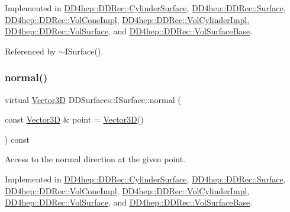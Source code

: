 Implemented in \hyperlink{class_d_d4hep_1_1_d_d_rec_1_1_cylinder_surface_a865ff9150e26d017de4357af5ea77d6b}{D\+D4hep\+::\+D\+D\+Rec\+::\+Cylinder\+Surface}, \hyperlink{class_d_d4hep_1_1_d_d_rec_1_1_surface_a766587a97ca4b6c7ef4d2f72b967379c}{D\+D4hep\+::\+D\+D\+Rec\+::\+Surface}, \hyperlink{class_d_d4hep_1_1_d_d_rec_1_1_vol_cone_impl_af32c1efbead53b381287c82e3ce23755}{D\+D4hep\+::\+D\+D\+Rec\+::\+Vol\+Cone\+Impl}, \hyperlink{class_d_d4hep_1_1_d_d_rec_1_1_vol_cylinder_impl_afea034d9cc2ea238ca37e867b368df60}{D\+D4hep\+::\+D\+D\+Rec\+::\+Vol\+Cylinder\+Impl}, \hyperlink{class_d_d4hep_1_1_d_d_rec_1_1_vol_surface_a282f3288c62a9f794f25f6519d1a2f4d}{D\+D4hep\+::\+D\+D\+Rec\+::\+Vol\+Surface}, and \hyperlink{class_d_d4hep_1_1_d_d_rec_1_1_vol_surface_base_a9cf248895aeb84a7e2cd2b2068661397}{D\+D4hep\+::\+D\+D\+Rec\+::\+Vol\+Surface\+Base}.



Referenced by $\sim$\+I\+Surface().

\hypertarget{class_d_d_surfaces_1_1_i_surface_abbead4b1af2864d6d3f61270543310a0}{}\label{class_d_d_surfaces_1_1_i_surface_abbead4b1af2864d6d3f61270543310a0} 
\subsubsection{\texorpdfstring{normal()}{normal()}}
{\footnotesize\ttfamily virtual \hyperlink{class_d_d_surfaces_1_1_vector3_d}{Vector3D} D\+D\+Surfaces\+::\+I\+Surface\+::normal (\begin{DoxyParamCaption}\item[{const \hyperlink{class_d_d_surfaces_1_1_vector3_d}{Vector3D} \&}]{point = {\ttfamily \hyperlink{class_d_d_surfaces_1_1_vector3_d}{Vector3D}()} }\end{DoxyParamCaption}) const\hspace{0.3cm}{\ttfamily [pure virtual]}}



Access to the normal direction at the given point. 



Implemented in \hyperlink{class_d_d4hep_1_1_d_d_rec_1_1_cylinder_surface_aa995b70c3bfeaa1a21c61b917e4507c5}{D\+D4hep\+::\+D\+D\+Rec\+::\+Cylinder\+Surface}, \hyperlink{class_d_d4hep_1_1_d_d_rec_1_1_surface_a39933172300e705018ff3b3a0de450a3}{D\+D4hep\+::\+D\+D\+Rec\+::\+Surface}, \hyperlink{class_d_d4hep_1_1_d_d_rec_1_1_vol_cone_impl_a0bdca94e1f57432f8b3d20c4cb1a3f7e}{D\+D4hep\+::\+D\+D\+Rec\+::\+Vol\+Cone\+Impl}, \hyperlink{class_d_d4hep_1_1_d_d_rec_1_1_vol_cylinder_impl_a96815a3a2f7f759ffe5028384308a1aa}{D\+D4hep\+::\+D\+D\+Rec\+::\+Vol\+Cylinder\+Impl}, \hyperlink{class_d_d4hep_1_1_d_d_rec_1_1_vol_surface_a67e403083cb340e874d6cb777868354d}{D\+D4hep\+::\+D\+D\+Rec\+::\+Vol\+Surface}, and \hyperlink{class_d_d4hep_1_1_d_d_rec_1_1_vol_surface_base_a247a1503e7265c3a9e4a6a17df2c58e4}{D\+D4hep\+::\+D\+D\+Rec\+::\+Vol\+Surface\+Base}.



